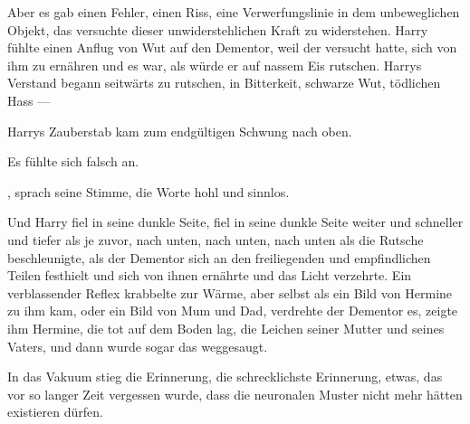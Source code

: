Aber es gab einen Fehler, einen Riss, eine Verwerfungslinie in dem unbeweglichen Objekt, das versuchte dieser unwiderstehlichen Kraft zu widerstehen. Harry fühlte einen Anflug von Wut auf den Dementor, weil der versucht hatte, sich von ihm zu ernähren und es war, als würde er auf nassem Eis rutschen. Harrys Verstand begann seitwärts zu rutschen, in Bitterkeit, schwarze Wut, tödlichen Hass —

Harrys Zauberstab kam zum endgültigen Schwung nach oben.

Es fühlte sich falsch an.

, sprach seine Stimme, die Worte hohl und sinnlos.

Und Harry fiel in seine dunkle Seite, fiel in seine dunkle Seite weiter und schneller und tiefer als je zuvor, nach unten, nach unten, nach unten als die Rutsche beschleunigte, als der Dementor sich an den freiliegenden und empfindlichen Teilen festhielt und sich von ihnen ernährte und das Licht verzehrte. Ein verblassender Reflex krabbelte zur Wärme, aber selbst als ein Bild von Hermine zu ihm kam, oder ein Bild von Mum und Dad, verdrehte der Dementor es, zeigte ihm Hermine, die tot auf dem Boden lag, die Leichen seiner Mutter und seines Vaters, und dann wurde sogar das weggesaugt.

In das Vakuum stieg die Erinnerung, die schrecklichste Erinnerung, etwas, das vor so langer Zeit vergessen wurde, dass die neuronalen Muster nicht mehr hätten existieren dürfen.

